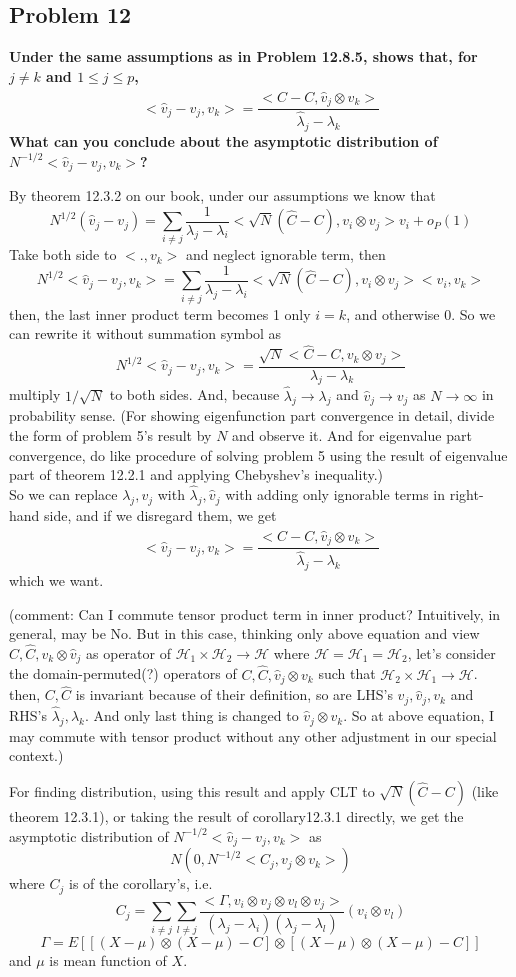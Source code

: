 \documentclass{article}
\begin{document}
\subsection{Problem 12}
\textbf{
Under the same assumptions as in Problem 12.8.5,
shows that, for $j\neq k$ and $1\leq j \leq p$,
\[<\hat{v}_j-v_j, v_k>=\frac{<\hat{C}-C,\hat{v}_j \otimes v_k>}{\hat{\lambda}_j-\lambda_k}\]
What can you conclude about the asymptotic distribution of $N^{-1/2}<\hat{v}_j-v_j,v_k>$?
}

By theorem 12.3.2 on our book, under our assumptions we know that 
\[N^{1/2}(\hat{v}_j-v_j)=\sum_{i\neq j}\frac{1}{\lambda_j-\lambda_i}<\sqrt{N}(\hat{C}-C), v_i\otimes v_j>v_i+o_P(1)\]
Take both side to $<., v_k>$ and neglect ignorable term, then
\[N^{1/2}<\hat{v}_j-v_j,v_k>=\sum_{i\neq j}\frac{1}{\lambda_j-\lambda_i}<\sqrt{N}(\hat{C}-C), v_i\otimes v_j><v_i,v_k>\]
then, the last inner product term becomes 1 only $i=k$, and otherwise 0. So we can rewrite it without summation symbol as 
\[N^{1/2}<\hat{v}_j-v_j,v_k>=\frac{\sqrt{N}<\hat{C}-C, v_k\otimes v_j>}{\lambda_j-\lambda_k}\]
multiply $1/\sqrt{N}$ to both sides.
And, because $\hat{\lambda}_j\rightarrow\lambda_j$ and $\hat{v}_j\rightarrow v_j$ as $N\rightarrow \infty$
in probability sense.
(For showing eigenfunction part convergence in detail, divide the form of problem 5's result by $N$ and observe it. 
And for eigenvalue part convergence, do like procedure of solving problem 5 using the result of eigenvalue part of theorem 12.2.1 and applying Chebyshev's inequality.)\\ 
So we can replace $\lambda_j, v_j$ with $\hat{\lambda}_j,\hat{v}_j$ with adding only ignorable terms in right-hand side,
and if we disregard them, we get
\[<\hat{v}_j-v_j, v_k>=\frac{<\hat{C}-C,\hat{v}_j \otimes v_k>}{\hat{\lambda}_j-\lambda_k}\]
which we want. 

(comment: Can I commute tensor product term in inner product? Intuitively, in general, may be No. But in this case,
thinking only above equation and view $C,\hat{C},v_k\otimes\hat{v}_j$ 
as operator of $\mathcal{H}_1\times\mathcal{H}_2\rightarrow\mathcal{H}$ 
where $\mathcal{H}=\mathcal{H}_1=\mathcal{H}_2$,
let's consider the domain-permuted(?) operators of $C,\hat{C},\hat{v}_j\otimes v_k$ 
such that $\mathcal{H}_2\times\mathcal{H}_1\rightarrow\mathcal{H}$.
then, $C, \hat{C}$ is invariant because of their definition, so are LHS's $v_j, \hat{v}_j, v_k$ and RHS's $\hat{\lambda}_j,\lambda_k$.
And only last thing is changed to $\hat{v}_j \otimes v_k$. So at above equation, I may commute with tensor product without any other adjustment in our special context.)

For finding distribution, using this result and apply CLT to $\sqrt{N}(\hat{C}-C)$ (like theorem 12.3.1), or taking the result of corollary12.3.1 directly, 
we get the asymptotic distribution of \(N^{-1/2}<\hat{v}_j-v_j,v_k>\) as
\[N(0, N^{-1/2}<C_j,v_j \otimes v_k>)\]
where $C_j$ is of the corollary's, i.e.
\[C_j=\sum_{i\neq j}\sum_{l\neq j}\frac{<\Gamma,v_i\otimes v_j\otimes v_l\otimes v_j>}
{(\lambda_j-\lambda_i)(\lambda_j-\lambda_l)}(v_i \otimes v_l)\]
\[\Gamma=E[[(X-\mu)\otimes(X-\mu)-C]\otimes[(X-\mu)\otimes(X-\mu)-C]]\]
and $\mu$ is mean function of $X$.
\end{document}
